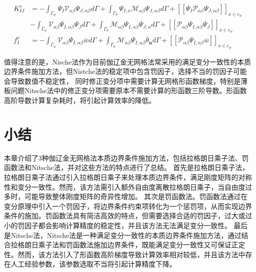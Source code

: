 \begin{subequations}\label{Pkv}
\begin{align}
 K^v_{IJ}&=-\int_{\Gamma_w}\Psi_I\mathcal{V}_{\alpha\beta}\Psi_{J,\alpha\beta}d\Gamma+\int_{\Gamma_{\theta}}\Psi_{I,n}\mathcal{M}_{\alpha\beta}\Psi_{J,\alpha\beta}d\Gamma+[[\Psi_I\mathcal{P}_{\alpha\beta}\Psi_{J,\alpha\beta}]]_{x\in{c_w}}\nonumber\\
     &-\int_{\Gamma_w}\mathcal{V}_{\alpha\beta}\Psi_{I,\alpha\beta}\Psi_Jd\Gamma+\int_{\Gamma_{\theta}}\mathcal{M}_{\alpha\beta}\Psi_{I,\alpha\beta}\Psi_{J,n}d\Gamma+[[\mathcal{P}_{\alpha\beta}\Psi_{I,\alpha\beta}\Psi_J]]_{x\in{c_w}}\\
 f_{I}^v&=-\int_{\Gamma_w}\mathcal{V}_{\alpha\beta}\Psi_{I,\alpha\beta}\bar{w}d\Gamma+\int_{\Gamma_{\theta}}\mathcal{M}_{\alpha\beta}\Psi_{I,\alpha\beta}\bar{\theta}_{\pmb n}d\Gamma+[[\mathcal{P}_{\alpha\beta}\Psi_{I,\alpha\beta}\bar{w}]]_{x\in{c_w}}
\end{align}
\end{subequations}
\par
值得注意的是，Nische法作为目前伽辽金无网格法常采用的满足变分一致性的本质边界条件施加方法，但Nistche法的稳定项中包含罚因子，选择不当的罚因子可能会导致数值不稳定性，
同时修正变分项中需要计算无网格形函数梯度，特别是薄板问题Nitsche法中的修正变分项需要原本不需要计算的形函数三阶导数。形函数高阶导数计算复杂耗时，将引起计算效率的降低。
\section{小结}
本章介绍了3种伽辽金无网格法本质边界条件施加方法，包括拉格朗日乘子法、罚函数法和Nitsche法，并对这些方法的特点进行了总结。
首先是拉格朗日乘子法，拉格朗日乘子法通过引入拉格朗日乘子来处理本质边界条件，满足刚度矩阵的对称性和变分一致性。然而，该方法需引入额外自由度离散拉格朗日乘子，当自由度过多时，可能导致整体刚度矩阵的奇异性增加。
其次是罚函数法。罚函数法通过在变分原理中引入一个罚因子，将边界条件约束项转化为一个惩罚项，从而实现边界条件的施加。罚函数法具有简洁高效的特点，但需要选择合适的罚因子，过大或过小的罚因子都会影响计算精度的稳定性，并且该方法无法满足变分一致性。
最后是Nitsche法，Nitsche法是一种满足变分一致性的本质边界条件施加方法，通过结合拉格朗日乘子法和罚函数法施加边界条件，既能满足变分一致性又可保证正定性。然而，该方法引入了形函数高阶梯度导致计算效率相对较低，并且该方法中存在人工经验参数，该参数选取不当将引起计算精度下降。




